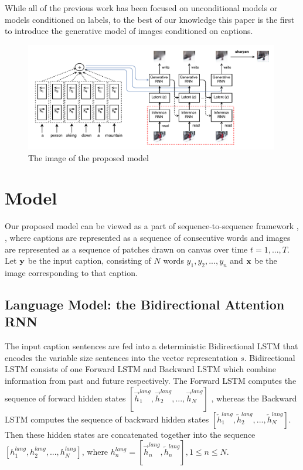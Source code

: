 \documentclass{article} %
\newcommand{\hlang}{h^{lang}}
\newcommand{\icaption}{{\bf{y}}}
\newcommand{\oimage}{{\bf{x}}}
\begin{document}
While all of the previous work has been focused on unconditional models or models conditioned on labels, to the best of our knowledge this paper is the first to introduce the generative model of images conditioned on captions.

\begin{figure}[!t]
\captionsetup[subfigure]{labelformat=empty}
\begin{center}
\includegraphics[width=0.99\textwidth]{figures/alignDraw-cropped.pdf}\quad
%
\end{center}
\caption{The image of the proposed model}
\label{fig:figmodel}
\vspace{-0.3cm}
\end{figure}

\section{Model}
Our proposed model can be viewed as a part of sequence-to-sequence framework \citep{ilya_mt}, \citep{cho_mt}, \citep{nitish_video} where captions are represented as a sequence of consecutive words and images are represented as a sequence of patches drawn on canvas over time $t=1,...,T$. Let $\icaption$ be the input caption, consisting of $N$ words $y_{1}, y_{2}, ..., y_{n}$ and $\oimage$ be the image corresponding to that caption.

\subsection{Language Model: the Bidirectional Attention RNN}
\label{sec:lang}
The input caption sentences are fed into a deterministic Bidirectional LSTM\cite{} that encodes the variable size sentences into the vector representation $s$. Bidirectional LSTM consists of one Forward LSTM and Backward LSTM which combine information from past and future respectively. The Forward LSTM computes the sequence of forward hidden states $[\overrightarrow{h}^{lang}_{1}, \overrightarrow{h}^{lang}_{2}, ..., \overrightarrow{h}^{lang}_{N}]$ , whereas the Backward LSTM computes the sequence of backward hidden states $[\overleftarrow{h}^{lang}_{1}, \overleftarrow{h}^{lang}_{2}, ..., \overleftarrow{h}^{lang}_{N}]$. Then these hidden states are concatenated together into the sequence $[\hlang_{1}, \hlang_{2}, ..., \hlang_{N}]$, where $\hlang_{n} = [\overrightarrow{h}^{lang}_{n}, \overleftarrow{h}^{lang}_{n}], 1\leq n\leq N$.
\end{document}
